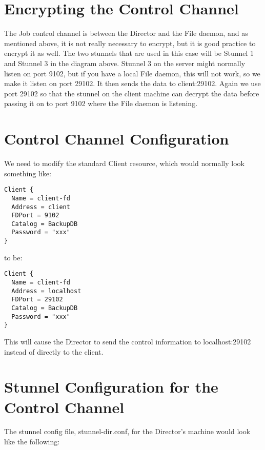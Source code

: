 \section{Encrypting the Control Channel}

The Job control channel is between the Director and the File daemon, and as
mentioned above, it is not really necessary to encrypt, but it is good
practice to encrypt it as well. The two stunnels that are used in this case
will be Stunnel 1 and Stunnel 3 in the diagram above. Stunnel 3 on the server
might normally listen on port 9102, but if you have a local File daemon, this
will not work, so we make it listen on port 29102. It then sends the data to
client:29102. Again we use port 29102 so that the stunnel on the client
machine can decrypt the data before passing it on to port 9102 where the File
daemon is listening.

\section{Control Channel Configuration}

We need to modify the standard Client resource, which would normally look
something like:

\footnotesize
\begin{verbatim}
Client {
  Name = client-fd
  Address = client
  FDPort = 9102
  Catalog = BackupDB
  Password = "xxx"
}
\end{verbatim}
\normalsize

to be:

\footnotesize
\begin{verbatim}
Client {
  Name = client-fd
  Address = localhost
  FDPort = 29102
  Catalog = BackupDB
  Password = "xxx"
}
\end{verbatim}
\normalsize

This will cause the Director to send the control information to
localhost:29102 instead of directly to the client.

\section{Stunnel Configuration for the Control Channel}

The stunnel config file, stunnel-dir.conf, for the Director's machine would
look like the following:

